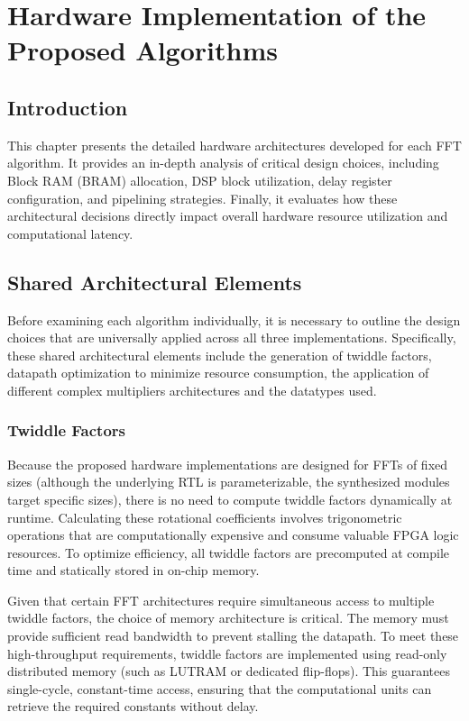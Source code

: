 \chapter{Hardware Implementation of the Proposed Algorithms}
\label{Implementation}

\section{Introduction}
This chapter presents the detailed hardware architectures developed for each FFT algorithm. It provides an in-depth analysis of critical design choices, including Block RAM (BRAM) allocation, DSP block utilization, delay register configuration, and pipelining strategies. Finally, it evaluates how these architectural decisions directly impact overall hardware resource utilization and computational latency.

\section{Shared Architectural Elements}
Before examining each algorithm individually, it is necessary to outline the design choices that are universally applied across all three implementations. Specifically, these shared architectural elements include the generation of twiddle factors, datapath optimization  to minimize resource consumption, the application of different complex multipliers architectures and the datatypes used.

\subsection{Twiddle Factors}
Because the proposed hardware implementations are designed for FFTs of fixed sizes (although the underlying RTL is parameterizable, the synthesized modules target specific sizes), there is no need to compute twiddle factors dynamically at runtime. Calculating these rotational coefficients involves trigonometric operations that are computationally expensive and consume valuable FPGA logic resources. To optimize efficiency, all twiddle factors are precomputed at compile time and statically stored in on-chip memory.

Given that certain FFT architectures require simultaneous access to multiple twiddle factors, the choice of memory architecture is critical. The memory must provide sufficient read bandwidth to prevent stalling the datapath. To meet these high-throughput requirements, twiddle factors are implemented using read-only distributed memory (such as LUTRAM or dedicated flip-flops). This guarantees single-cycle, constant-time access, ensuring that the computational units can retrieve the required constants without delay.

